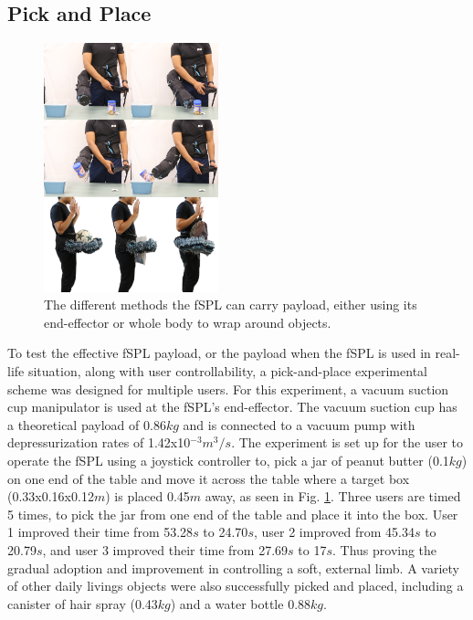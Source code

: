 \documentclass[letterpaper, 10 pt, conference]{ieeeconf}  %
\begin{document}
\subsection{Pick and Place}

\begin{figure}[b!]
\centering
\includegraphics[width=0.45\textwidth]{Figures/pick_place_whole_body}
\caption{The different methods the fSPL can carry payload, either using its end-effector or whole body to wrap around objects.}
\label{fig:pick_place_whole_body}
\vspace{-1.5em}
\end{figure}

To test the effective fSPL payload, or the payload when the fSPL is used in real-life situation, along with user controllability, a pick-and-place experimental scheme was designed for multiple users. For this experiment, a vacuum suction cup manipulator is used at the fSPL's end-effector. The vacuum suction cup has a theoretical payload of 0.86$kg$ and is connected to a vacuum pump with depressurization rates of 1.42x10$^{-3}m^3/s$. The experiment is set up for the user to operate the fSPL using a joystick controller to, pick a jar of peanut butter (0.1$kg$) on one end of the table and move it across the table where a target box (0.33x0.16x0.12$m$) is placed 0.45$m$ away, as seen in Fig. \ref{fig:pick_place_whole_body}. Three users are timed 5 times, to pick the jar from one end of the table and place it into the box.   User 1 improved their time from 53.28$s$ to 24.70$s$, user 2 improved from 45.34$s$ to 20.79$s$, and user 3 improved their time from 27.69$s$ to 17$s$. Thus proving the gradual adoption and improvement in controlling a soft, external limb. A variety of other daily livings objects were also successfully picked and placed, including a canister of hair spray (0.43$kg$) and a water bottle 0.88$kg$.
\end{document}
